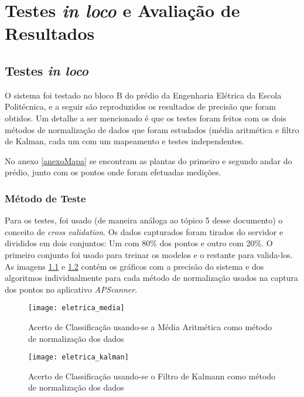 \chapter{Testes \textit{in loco} e Avaliação de Resultados}

\section{Testes \textit{in loco}}
\label{testesinloco}

O sistema foi testado no bloco B do prédio da Engenharia Elétrica da Escola Politécnica, e a seguir são reproduzidos os resultados de precisão que foram obtidos. Um detalhe a ser mencionado é que os testes foram feitos com os dois métodos de normalização de dados que foram estudados (média aritmética e filtro de Kalman, cada um com um mapeamento e testes independentes.
\par
No anexo \ref{anexoMapa} se encontram as plantas do primeiro e segundo andar do prédio, junto com os pontos onde foram efetuadas medições.



\subsection{Método de Teste}

Para os testes, foi usado (de maneira análoga ao tópico 5 desse documento) o conceito de \textit{cross validation}. Os dados capturados foram tirados do servidor e divididos em dois conjuntos: Um com 80\% dos pontos e outro com 20\%. O primeiro conjunto foi usado para treinar os modelos e o restante para valida-los. As imagens \ref{fig:eletricaMedia} e \ref{fig:eletricaKalman} contém os gráficos com a precisão do sistema e dos algoritmos individualmente para cada método de normalização usados na captura dos pontos no aplicativo \textit{APScanner}.

\begin{figure}[H]

\centering
\caption{Acerto de Classificação usando-se a Média Aritmética como método de normalização dos dados}
\texttt{[image: eletrica\_media]}
\label{fig:eletricaMedia}

\end{figure}


\begin{figure}[H]

\centering
\caption{Acerto de Classificação usando-se o Filtro de Kalmann como método de normalização dos dados}
\texttt{[image: eletrica\_kalman]}
\label{fig:eletricaKalman}

\end{figure}

